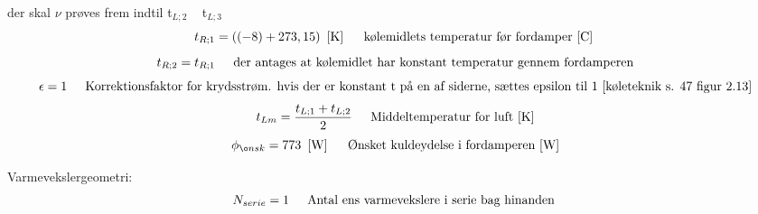 \documentclass[../Hovedrapport.tex]{subfiles}
\newcommand{\I}{\mbox{\hspace{0.20in}}}
\begin{document}
\vspace{0.10in}
\noindent
\rm der skal $\nu$ prøves frem indtil t$_{L;2}$ ~ t$_{L;3}$
\begin{equation}
\label{EES Eqn:4}
t_{R;1} =  \left(  \left( -8 \right)  + 273,15 \right)    \   \left[ \rm K \right]	 
\mbox{\I kølemidlets temperatur før fordamper [C] }
\end{equation}
\begin{equation}
\label{EES Eqn:5}
t_{R;2} = t_{R;1	} 
\mbox{\I der antages at kølemidlet har konstant temperatur gennem fordamperen}
\end{equation}
\begin{equation}
\label{EES Eqn:6}
\epsilon = 1	 
\mbox{\I Korrektionsfaktor for krydsstrøm. hvis der er konstant t på en af siderne, sættes epsilon til 1 [køleteknik s. 47 figur 2.13]}
\end{equation}
\begin{equation}
\label{EES Eqn:7}
t_{Lm} = \frac {t_{L;1}+t_{L;2}}{ 2	 } 
\mbox{\I Middeltemperatur for luft [K]}
\end{equation}
\begin{equation}
\label{EES Eqn:8}
\phi_{ønsk} = 773   \   \left[ \rm W \right]	 
\mbox{\I Ønsket kuldeydelse i fordamperen [W]}
\end{equation}

\vspace{0.10in}
\noindent
\rm Varmevekslergeometri:
\begin{equation}
\label{EES Eqn:9}
N_{serie} = 1	 
\mbox{\I Antal ens varmevekslere i serie bag hinanden }
\end{equation}
\end{document}
